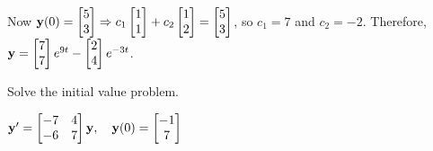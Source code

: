 \documentclass{ximera}
\begin{document}
\begin{problem}
\begin{solution}
Now  ${\bf y}(0)= \begin{bmatrix}5\\3\end{bmatrix}\Rightarrow
c_1 \begin{bmatrix}1\\1\end{bmatrix}+c_2 \begin{bmatrix}1\\2\end{bmatrix}= \begin{bmatrix}5\\3\end{bmatrix}$, so $c_1=7$
and $c_2=-2$. Therefore,
${\bf y}= \begin{bmatrix}7\\7\end{bmatrix}e^{9t}-\begin{bmatrix}2\\4\end{bmatrix}e^{-3t}$.
\end{solution}
\end{problem}

\begin{problem}\label{exer:10.4.19}
Solve the initial value problem.

$ {\bf y}'=\begin{bmatrix}-7&4\\-6&7\end{bmatrix}{\bf y},\quad{\bf
y}(0)= \begin{bmatrix}-1\\7\end{bmatrix}$
\end{problem}
\end{document}
